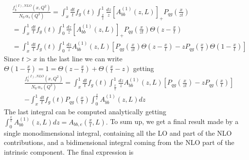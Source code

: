 \documentclass[10pt,a4paper]{article}
\begin{document}
\begin{equation}
\begin{split}
&\frac{f_b^{\left(I\right),NLO}\left(x,Q^2\right)}{N_0 \,\alpha_s\left(Q^2\right)}= \int_x^1 \frac{dt}{t} f_g\left(t\right) \int_{\frac{x}{t}}^{1}\frac{dz}{z}\left[A_{bb}^{\left(1\right)}\left(z,L\right)\right]_{+}P_{qg}\left(\frac{x}{zt}\right) \\
&=\int_x^1 \frac{dt}{t} f_g\left(t\right) \int_{0}^{1}\frac{dz}{z}\left[A_{bb}^{\left(1\right)}\left(z,L\right)\right]_{+}P_{qg}\left(\frac{x}{zt}\right)\Theta\left(z-\frac{x}{t}\right) \\
&=\int_x^1 \frac{dt}{t} f_g\left(t\right) \int_{0}^{1}\frac{dz}{z}A_{bb}^{\left(1\right)}\left(z,L\right)\left[P_{qg}\left(\frac{x}{zt}\right)\Theta\left(z-\frac{x}{t}\right) - z P_{qg}\left(\frac{x}{t}\right)\Theta\left(1-\frac{x}{t}\right)\right]
\end{split}
\end{equation}
Since $t > x $ in the last line we can write $\Theta\left(1-\frac{x}{t}\right)=1=\Theta\left(z-\frac{x}{t}\right)+\Theta\left(\frac{x}{t}-z\right)  $ getting
\begin{equation}
\begin{split}
&\frac{f_b^{\left(I\right),NLO}\left(x,Q^2\right)}{N_0\,\alpha_s\left(Q^2\right)}= \int_x^1 \frac{dt}{t} f_g\left(t\right) \int_{\frac{x}{t}}^{1}\frac{dz}{z}A_{bb}^{\left(1\right)}\left(z,L\right)\left[P_{qg}\left(\frac{x}{zt}\right) - z P_{qg}\left(\frac{x}{t}\right)\right] \\
& - \int_x^1 \frac{dt}{t} f_g\left(t\right)P_{qg}\left(\frac{x}{t}\right)\int_0^{\frac{x}{t}}A_{bb}^{\left(1\right)}\left(z,L\right) dz 
\end{split}
\end{equation}
The last integral can be computed analytically getting $\int_0^{\frac{x}{t}}A_{bb}^{\left(1\right)}\left(z,L\right) dz = A_{bb,e}\left(\frac{x}{t}, L\right).$
To sum up, we get a final result made by a single monodimensional integral, containing all the LO and part of the NLO contributions, and a bidimensional integral coming from the NLO part of the intrinsic component. The final expression is 
\end{document}
